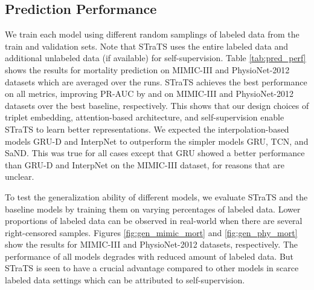 \subsection{Prediction Performance}
We train each model using  different random samplings of  labeled data from the train and validation sets. Note that STraTS uses the entire labeled data and additional unlabeled data (if available) for self-supervision. 
Table \ref{tab:pred_perf} shows the results for mortality prediction on MIMIC-III and PhysioNet-2012 datasets which are averaged over the  runs. 
STraTS achieves the best performance on all metrics, improving PR-AUC by  and  on MIMIC-III and PhysioNet-2012 datasets over the best baseline,  respectively. This shows that our design choices of triplet embedding, attention-based architecture, and self-supervision enable STraTS to learn better representations.
We expected the interpolation-based models GRU-D and InterpNet to outperform the simpler models GRU, TCN, and SaND. This was true for all cases except that GRU showed a better performance than GRU-D and InterpNet on the MIMIC-III dataset, for reasons that are unclear.


To test the generalization ability of different models, we evaluate STraTS and the baseline models by training them on varying percentages of labeled data. Lower proportions of labeled data can be observed in real-world when there are several right-censored samples.
Figures \ref{fig:gen_mimic_mort} and \ref{fig:gen_phy_mort} show the results for MIMIC-III and PhysioNet-2012 datasets, respectively. The performance of all models degrades with reduced amount of labeled data. But STraTS is seen to have a crucial advantage compared to other models in scarce labeled data settings which can be attributed to self-supervision.


